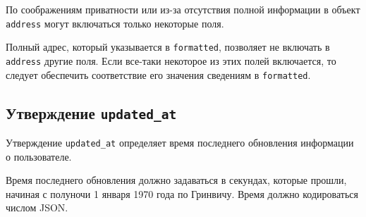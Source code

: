 По соображениям приватности или из-за отсутствия полной информации 
в объект \lstinline{address} могут включаться только некоторые поля.

Полный адрес, который указывается в \lstinline{formatted},
позволяет не включать в \lstinline{address} другие поля.
%
Если все-таки некоторое из этих полей включается, 
то следует обеспечить соответствие его значения сведениям в 
\lstinline{formatted}. 

\subsection{Утверждение \lstinline{updated_at}}\label{CLAIMS.UpdatedAt}

Утверждение \lstinline{updated_at} определяет время последнего обновления 
информации о пользователе. 

Время последнего обновления должно задаваться в секундах, которые прошли, 
начиная с полуночи 1 января 1970 года по Гринвичу. Время должно кодироваться 
числом JSON.  


